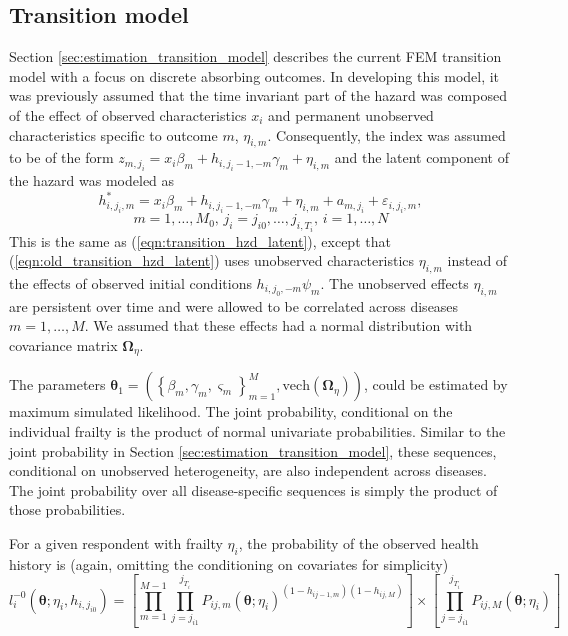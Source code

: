 \subsection{Transition model}
\label{sec:model_development_transition_model}

Section \ref{sec:estimation_transition_model} describes the current FEM transition
model with a focus on discrete absorbing outcomes. In developing this model, 
it was previously assumed that the time invariant part of the hazard was composed 
of the effect of observed characteristics $x_i$ and permanent unobserved characteristics 
specific to outcome $m$, $\eta_{i,m}$.  Consequently, the index was assumed to be 
of the form 
$z_{m,j_i} = x_i\beta_m + h_{i,j_i-1,-m} \gamma_m + \eta_{i,m}$ 
and the latent component of the hazard was modeled as
\begin{equation}
h^*_{i,j_i,m}= x_i\beta_m + h_{i,j_i-1,-m} \gamma_m + \eta_{i,m} + a_{m,j_i} + \varepsilon_{i,j_i,m},
\label{eqn:old_transition_hzd_latent}
\end{equation}
\[
m = 1,\ldots,M_0 \mbox{, } j_i = j_{i0},\ldots,j_{i,T_i} \mbox{, } i=1,\ldots,N
\]
This is the same as (\ref{eqn:transition_hzd_latent}), except that 
(\ref{eqn:old_transition_hzd_latent}) uses unobserved characteristics $\eta_{i,m}$
instead of the effects of observed initial conditions $h_{i,j_0,-m}\psi_m$. The 
unobserved effects $\eta_{i,m}$ are persistent over time and were 
allowed to be correlated across diseases $m=1,\ldots,M$.  We assumed that these 
effects had a normal distribution with covariance matrix $\mathbf{\Omega}_\eta$.

The parameters 
$\mathbf{\theta}_1 = \left(\left\{\beta_m, \gamma_m, \varsigma_m\right\}_{m=1}^M, \mathrm{vech}(\mathbf{\Omega}_\eta)\right)$, 
could be estimated by maximum simulated likelihood. The joint probability, 
conditional on the individual frailty is the product of normal univariate 
probabilities. Similar to the joint probability in Section 
\ref{sec:estimation_transition_model}, these sequences, conditional on unobserved 
heterogeneity, are also independent across diseases.  The joint probability over 
all disease-specific sequences is simply the product of those probabilities.

For a given respondent with frailty $\eta_i$, the probability of the observed 
health history is (again, omitting the conditioning on covariates for simplicity)
\[
	l^{-0}_i(\mathbf{\theta}; \eta_i, h_{i,j_{i0}}) = \left[\prod_{m=1}^{M-1} \prod_{j=j_{i1}}^{j_{T_i}} P_{ij,m}(\mathbf{\theta}; \eta_i)^{(1-h_{ij-1,m})(1-h_{ij,M})} \right] \times \left[\prod_{j=j_{i1}}^{j_{T_i}} P_{ij,M}(\mathbf{\theta}; \eta_i) \right]
\]

